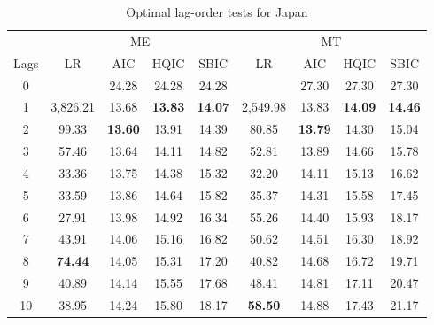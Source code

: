\documentclass[a4paper, twoside]{templates/ociamthesis}
\begin{document}
\begin{table}[H]

\caption{\label{tab:TableC25}Optimal lag-order tests for Japan}
\centering
\fontsize{10}{12}\selectfont
\begin{tabular}[t]{ccccccccc}
\toprule
\multicolumn{1}{c}{ } & \multicolumn{4}{c}{ME} & \multicolumn{4}{c}{MT} \\
\cmidrule(l{3pt}r{3pt}){2-5} \cmidrule(l{3pt}r{3pt}){6-9}
Lags & LR & AIC & HQIC & SBIC & LR & AIC & HQIC & SBIC\\
\midrule
0 &  & 24.28 & 24.28 & 24.28 &  & 27.30 & 27.30 & 27.30\\
1 & 3,826.21 & 13.68 & \textbf{13.83} & \textbf{14.07} & 2,549.98 & 13.83 & \textbf{14.09} & \textbf{14.46}\\
2 & 99.33 & \textbf{13.60} & 13.91 & 14.39 & 80.85 & \textbf{13.79} & 14.30 & 15.04\\
3 & 57.46 & 13.64 & 14.11 & 14.82 & 52.81 & 13.89 & 14.66 & 15.78\\
4 & 33.36 & 13.75 & 14.38 & 15.32 & 32.20 & 14.11 & 15.13 & 16.62\\
5 & 33.59 & 13.86 & 14.64 & 15.82 & 35.37 & 14.31 & 15.58 & 17.45\\
6 & 27.91 & 13.98 & 14.92 & 16.34 & 55.26 & 14.40 & 15.93 & 18.17\\
7 & 43.91 & 14.06 & 15.16 & 16.82 & 50.62 & 14.51 & 16.30 & 18.92\\
8 & \textbf{74.44} & 14.05 & 15.31 & 17.20 & 40.82 & 14.68 & 16.72 & 19.71\\
9 & 40.89 & 14.14 & 15.55 & 17.68 & 48.41 & 14.81 & 17.11 & 20.47\\
10 & 38.95 & 14.24 & 15.80 & 18.17 & \textbf{58.50} & 14.88 & 17.43 & 21.17\\
\bottomrule
\end{tabular}
\end{table}

\clearpage
\end{document}
